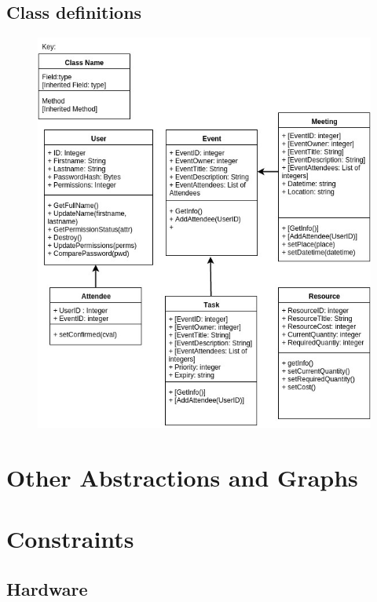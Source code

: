 \subsection{Class definitions}

\begin{figure}[H]
	\includegraphics[width=\textwidth]{./Analysis/diagrams/ods.jpg}
\end{figure}

\section{Other Abstractions and Graphs}

\section{Constraints}

\subsection{Hardware}

